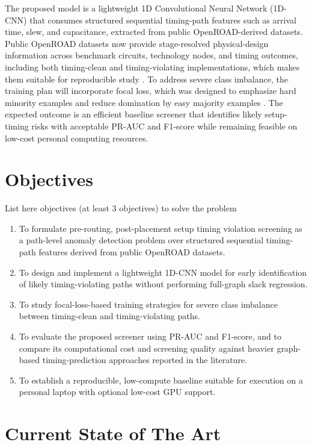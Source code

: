 \documentclass[12pt,a4paper]{article}
\begin{document}
The proposed model is a lightweight 1D Convolutional Neural Network (1D-CNN) that consumes structured sequential timing-path features such as arrival time, slew, and capacitance, extracted from public OpenROAD-derived datasets. Public OpenROAD datasets now provide stage-resolved physical-design information across benchmark circuits, technology nodes, and timing outcomes, including both timing-clean and timing-violating implementations, which makes them suitable for reproducible study \cite{Shrestha2026EDASchemaV2,Shrestha2024EDASchema}. To address severe class imbalance, the training plan will incorporate focal loss, which was designed to emphasize hard minority examples and reduce domination by easy majority examples \cite{Lin2017FocalLoss,Mahmoodi2024AWFL}. The expected outcome is an efficient baseline screener that identifies likely setup-timing risks with acceptable PR-AUC and F1-score while remaining feasible on low-cost personal computing resources.

\section{Objectives} \label{sec:Obj}
 List here objectives (at least 3 objectives) to solve the problem
\begin{enumerate}
\item To formulate pre-routing, post-placement setup timing violation screening as a path-level anomaly detection problem over structured sequential timing-path features derived from public OpenROAD datasets.
\item To design and implement a lightweight 1D-CNN model for early identification of likely timing-violating paths without performing full-graph slack regression.
\item To study focal-loss-based training strategies for severe class imbalance between timing-clean and timing-violating paths.
\item To evaluate the proposed screener using PR-AUC and F1-score, and to compare its computational cost and screening quality against heavier graph-based timing-prediction approaches reported in the literature.
\item To establish a reproducible, low-compute baseline suitable for execution on a personal laptop with optional low-cost GPU support.
\end{enumerate}

\section{Current State of The Art}
\end{document}
